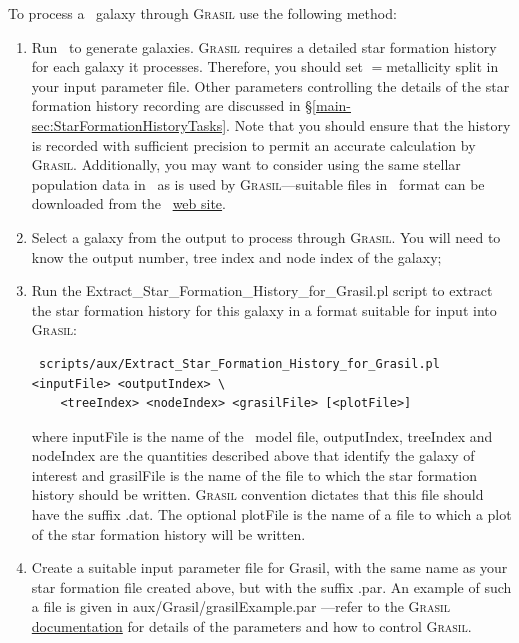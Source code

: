 To process a \glc\ galaxy through {\normalfont \scshape Grasil} use the following method:
\begin{enumerate}
 \item Run \glc\ to generate galaxies. {\normalfont \scshape Grasil} requires a detailed star formation history for each galaxy it processes. Therefore, you should set {\normalfont \ttfamily [starFormationHistoriesMethod]}$=${\normalfont \ttfamily metallicity split} in your input parameter file. Other parameters controlling the details of the star formation history recording are discussed in \S\ref{main-sec:StarFormationHistoryTasks}. Note that you should ensure that the history is recorded with sufficient precision to permit an accurate calculation by {\normalfont \scshape Grasil}. Additionally, you may want to consider using the same stellar population data in \glc\ as is used by {\normalfont \scshape Grasil}---suitable files in \glc\ format can be downloaded from the \glc\ \href{https://sites.google.com/site/galacticusmodel/home/auxiliary-data}{web site}.
 \item Select a galaxy from the output to process through {\normalfont \scshape Grasil}. You will need to know the output number, tree index and node index of the galaxy;
 \item Run the {\normalfont \ttfamily Extract\_Star\_Formation\_History\_for\_Grasil.pl} script to extract the star formation history for this galaxy in a format suitable for input into {\normalfont \scshape Grasil}:
\begin{verbatim}
 scripts/aux/Extract_Star_Formation_History_for_Grasil.pl <inputFile> <outputIndex> \
    <treeIndex> <nodeIndex> <grasilFile> [<plotFile>]
\end{verbatim}
where {\normalfont \ttfamily inputFile} is the name of the \glc\ model file, {\normalfont \ttfamily outputIndex}, {\normalfont \ttfamily treeIndex} and {\normalfont \ttfamily nodeIndex} are the quantities described above that identify the galaxy of interest and {\normalfont \ttfamily grasilFile} is the name of the file to which the star formation history should be written. {\normalfont \scshape Grasil} convention dictates that this file should have the suffix {\normalfont \ttfamily .dat}. The optional {\normalfont \ttfamily plotFile} is the name of a file to which a plot of the star formation history will be written.
 \item Create a suitable input parameter file for {\normalfont \ttfamily Grasil}, with the same name as your star formation file created above, but with the suffix {\normalfont \ttfamily .par}. An example of such a file is given in {\normalfont \ttfamily aux/Grasil/grasilExample.par} ---refer to the {\normalfont \scshape Grasil} \href{http://adlibitum.oat.ts.astro.it/silva/grasil/grasil.doc}{documentation} for details of the parameters and how to control {\normalfont \scshape Grasil}. 

\end{enumerate}
